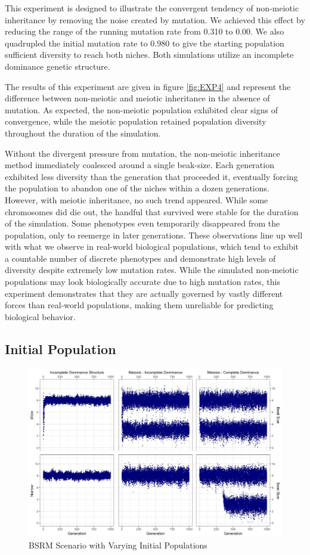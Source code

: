 \documentclass[conference]{IEEEtran}
\begin{document}
This experiment is designed to illustrate the convergent tendency of non-meiotic inheritance by removing the noise created by mutation. We achieved this effect by reducing the range of the running mutation rate from 0.310 to 0.00. We also quadrupled the initial mutation rate to 0.980 to give the starting population sufficient diversity to reach both niches. Both simulations utilize an incomplete dominance genetic structure. 

The results of this experiment are given in figure \ref{fig:EXP4} and represent the difference between non-meiotic and meiotic inheritance in the absence of mutation. As expected, the non-meiotic population exhibited clear signs of convergence, while the meiotic population retained population diversity throughout the duration of the simulation. 

Without the divergent pressure from mutation, the non-meiotic inheritance method immediately coalesced around a single beak-size. Each generation exhibited less diversity than the generation that proceeded it, eventually forcing the population to abandon one of the niches within a dozen generations. However, with meiotic inheritance, no such trend appeared. While some chromosomes did die out, the handful that survived were stable for the duration of the simulation. Some phenotypes even temporarily disappeared from the population, only to reemerge in later generations. These observations line up well with what we observe in real-world biological populations, which tend to exhibit a countable number of discrete phenotypes and demonstrate high levels of diversity despite extremely low mutation rates. While the simulated non-meiotic populations may look biologically accurate due to high mutation rates, this experiment demonstrates that they are actually governed by vastly different forces than real-world populations, making them unreliable for predicting biological behavior. 

\subsection{Initial Population}

\begin{figure}
    \centering
    \includegraphics[width=\linewidth]{DATA_JPG/EXP5}
    \caption{BSRM Scenario with Varying Initial Populations}
    \label{fig:EXP5}
\end{figure}
\end{document}

